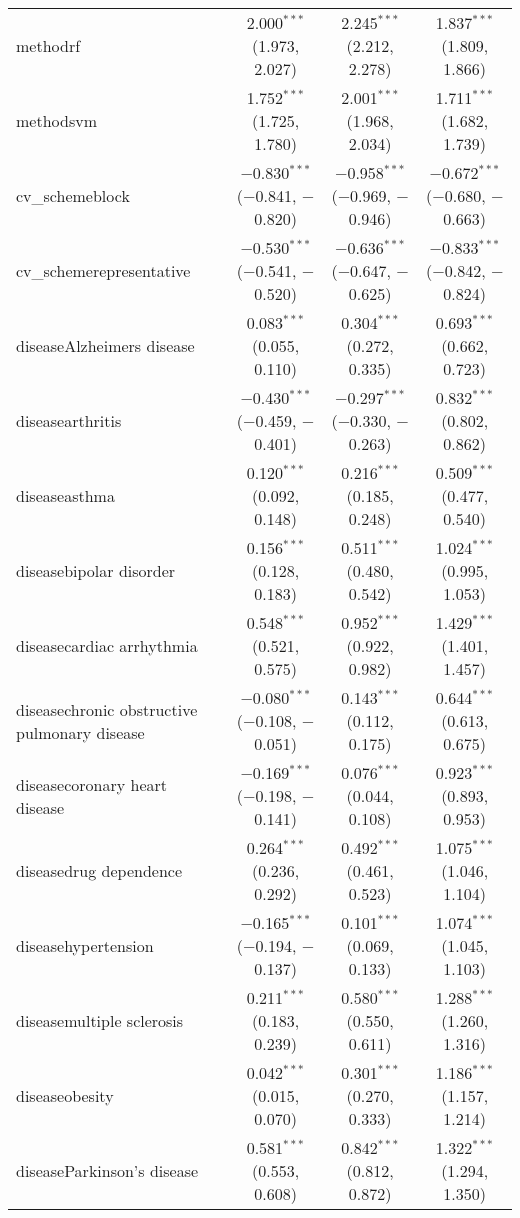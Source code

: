 \begin{table}[!htbp]
\begin{tabular}{@{\extracolsep{5pt}}lccc}
  methodrf & 2.000$^{***}$ (1.973, 2.027) & 2.245$^{***}$ (2.212, 2.278) & 1.837$^{***}$ (1.809, 1.866) \\ 
  methodsvm & 1.752$^{***}$ (1.725, 1.780) & 2.001$^{***}$ (1.968, 2.034) & 1.711$^{***}$ (1.682, 1.739) \\ 
  cv\_schemeblock & $-$0.830$^{***}$ ($-$0.841, $-$0.820) & $-$0.958$^{***}$ ($-$0.969, $-$0.946) & $-$0.672$^{***}$ ($-$0.680, $-$0.663) \\ 
  cv\_schemerepresentative & $-$0.530$^{***}$ ($-$0.541, $-$0.520) & $-$0.636$^{***}$ ($-$0.647, $-$0.625) & $-$0.833$^{***}$ ($-$0.842, $-$0.824) \\ 
  diseaseAlzheimers disease & 0.083$^{***}$ (0.055, 0.110) & 0.304$^{***}$ (0.272, 0.335) & 0.693$^{***}$ (0.662, 0.723) \\ 
  diseasearthritis & $-$0.430$^{***}$ ($-$0.459, $-$0.401) & $-$0.297$^{***}$ ($-$0.330, $-$0.263) & 0.832$^{***}$ (0.802, 0.862) \\ 
  diseaseasthma & 0.120$^{***}$ (0.092, 0.148) & 0.216$^{***}$ (0.185, 0.248) & 0.509$^{***}$ (0.477, 0.540) \\ 
  diseasebipolar disorder & 0.156$^{***}$ (0.128, 0.183) & 0.511$^{***}$ (0.480, 0.542) & 1.024$^{***}$ (0.995, 1.053) \\ 
  diseasecardiac arrhythmia & 0.548$^{***}$ (0.521, 0.575) & 0.952$^{***}$ (0.922, 0.982) & 1.429$^{***}$ (1.401, 1.457) \\ 
  diseasechronic obstructive pulmonary disease & $-$0.080$^{***}$ ($-$0.108, $-$0.051) & 0.143$^{***}$ (0.112, 0.175) & 0.644$^{***}$ (0.613, 0.675) \\ 
  diseasecoronary heart disease & $-$0.169$^{***}$ ($-$0.198, $-$0.141) & 0.076$^{***}$ (0.044, 0.108) & 0.923$^{***}$ (0.893, 0.953) \\ 
  diseasedrug dependence & 0.264$^{***}$ (0.236, 0.292) & 0.492$^{***}$ (0.461, 0.523) & 1.075$^{***}$ (1.046, 1.104) \\ 
  diseasehypertension & $-$0.165$^{***}$ ($-$0.194, $-$0.137) & 0.101$^{***}$ (0.069, 0.133) & 1.074$^{***}$ (1.045, 1.103) \\ 
  diseasemultiple sclerosis & 0.211$^{***}$ (0.183, 0.239) & 0.580$^{***}$ (0.550, 0.611) & 1.288$^{***}$ (1.260, 1.316) \\ 
  diseaseobesity & 0.042$^{***}$ (0.015, 0.070) & 0.301$^{***}$ (0.270, 0.333) & 1.186$^{***}$ (1.157, 1.214) \\ 
  diseaseParkinson's disease & 0.581$^{***}$ (0.553, 0.608) & 0.842$^{***}$ (0.812, 0.872) & 1.322$^{***}$ (1.294, 1.350) \\ 

\end{tabular}
\end{table}
